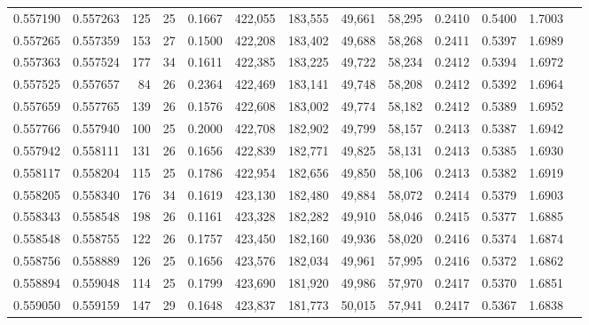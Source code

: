 \begin{tabular}{rrrrrrrrrrrrr}
0.557190 & 0.557263 &   125 &  25 &                                     0.1667 & 422,055 & 183,555 &  49,661 &  58,295 & 0.2410 & 0.5400 & 1.7003 \\
0.557265 & 0.557359 &   153 &  27 &                                     0.1500 & 422,208 & 183,402 &  49,688 &  58,268 & 0.2411 & 0.5397 & 1.6989 \\
0.557363 & 0.557524 &   177 &  34 &                                     0.1611 & 422,385 & 183,225 &  49,722 &  58,234 & 0.2412 & 0.5394 & 1.6972 \\
0.557525 & 0.557657 &    84 &  26 &                                     0.2364 & 422,469 & 183,141 &  49,748 &  58,208 & 0.2412 & 0.5392 & 1.6964 \\
0.557659 & 0.557765 &   139 &  26 &                                     0.1576 & 422,608 & 183,002 &  49,774 &  58,182 & 0.2412 & 0.5389 & 1.6952 \\
0.557766 & 0.557940 &   100 &  25 &                                     0.2000 & 422,708 & 182,902 &  49,799 &  58,157 & 0.2413 & 0.5387 & 1.6942 \\
0.557942 & 0.558111 &   131 &  26 &                                     0.1656 & 422,839 & 182,771 &  49,825 &  58,131 & 0.2413 & 0.5385 & 1.6930 \\
0.558117 & 0.558204 &   115 &  25 &                                     0.1786 & 422,954 & 182,656 &  49,850 &  58,106 & 0.2413 & 0.5382 & 1.6919 \\
0.558205 & 0.558340 &   176 &  34 &                                     0.1619 & 423,130 & 182,480 &  49,884 &  58,072 & 0.2414 & 0.5379 & 1.6903 \\
0.558343 & 0.558548 &   198 &  26 &                                     0.1161 & 423,328 & 182,282 &  49,910 &  58,046 & 0.2415 & 0.5377 & 1.6885 \\
0.558548 & 0.558755 &   122 &  26 &                                     0.1757 & 423,450 & 182,160 &  49,936 &  58,020 & 0.2416 & 0.5374 & 1.6874 \\
0.558756 & 0.558889 &   126 &  25 &                                     0.1656 & 423,576 & 182,034 &  49,961 &  57,995 & 0.2416 & 0.5372 & 1.6862 \\
0.558894 & 0.559048 &   114 &  25 &                                     0.1799 & 423,690 & 181,920 &  49,986 &  57,970 & 0.2417 & 0.5370 & 1.6851 \\
0.559050 & 0.559159 &   147 &  29 &                                     0.1648 & 423,837 & 181,773 &  50,015 &  57,941 & 0.2417 & 0.5367 & 1.6838 \\

\end{tabular}
